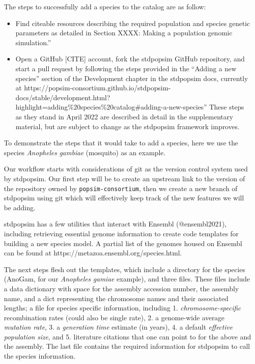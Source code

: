 \documentclass[hidelinks]{article}
\providecommand{\tightlist}{%
\setlength{\itemsep}{0pt}\setlength{\parskip}{0pt}}
\begin{document}
The steps to successfully add a species to the catalog are as follow:

\begin{itemize}
\tightlist
\item
  Find citeable resources describing the required population and species
  genetic parameters as detailed in Section XXXX: Making a population
  genomic simulation.''
\item
  Open a GitHub {[}CITE{]} account, fork the stdpopsim GitHub
  repository, and start a pull request by following the steps provided
  in the ``Adding a new species'' section of the Development chapter in
  the stdpopsim docs, currently at
  https://popsim-consortium.github.io/stdpopsim-docs/stable/development.html?highlight=adding\%20species\%20catalog\#adding-a-new-species''
  These steps as they stand in April 2022 are described in detail in the
  supplementary material, but are subject to change as the stdpopsim
  framework improves.
\end{itemize}

To demonstrate the steps that it would take to add a species, here we
use the species \emph{Anopheles gambiae} (mosquito) as an example.

Our workflow starts with considerations of git as the version control
system used by stdpopsim. Our first step will be to create an upstream
link to the version of the repository owned by
\texttt{popsim-consortium}, then we create a new branch of stdpopsim
using git which will effectively keep track of the new features we will
be adding.

stdpopsim has a few utilities that interact with Ensembl (@ensembl2021),
including retrieving essential genome information to create code
templates for building a new species model. A partial list of the
genomes housed on Ensembl can be found at
https://metazoa.ensembl.org/species.html.

The next steps flesh out the templates, which include a directory for
the species (AnoGam, for our \emph{Anopheles gamiae} example), and three
files. These files include a data dictionary with space for the assembly
accession number, the assembly name, and a dict representing the
chromosome names and their associated lengths; a file for species
specific information, including 1. \emph{chromosome-specific}
recombination rates (could also be single rate), 2. a genome-wide
average \emph{mutation rate}, 3. a \emph{generation time} estimate (in
years), 4. a default \emph{effective population size}, and 5. literature
citations that one can point to for the above and the assembly. The last
file contains the required information for stdpopsim to call the species
information.
\end{document}
